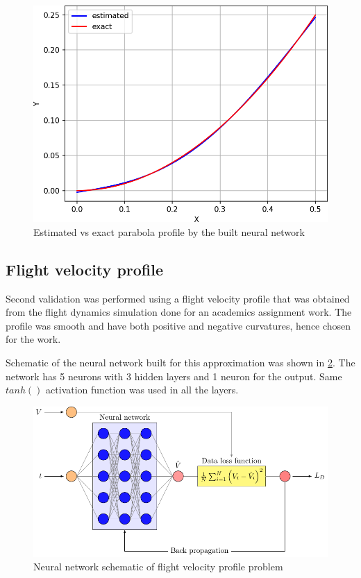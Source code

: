 \begin{figure}
   \center
    \includegraphics[scale=0.7]{supportingFiles/02_results/01_parabola_datadriven/estimation.png}
    \caption{Estimated vs exact parabola profile by the built neural network}
    \label{parabola_result}
\end{figure}


\subsection{Flight velocity profile}
\par{}
Second validation was performed using a flight velocity profile that was obtained
from the flight dynamics simulation done for an academics assignment work.
The profile was smooth and have both positive and negative curvatures, hence
chosen for the work. \\

\par{}
Schematic of the neural network built for this approximation was shown in
\cref{velocity_profile_network}. The network has 5 neurons with 3 hidden layers
and 1 neuron for the output. Same \(tanh()\) activation function was used
in all the layers. \\

\begin{figure}
   \center
    \includegraphics[scale=1]{supportingFiles/01_schematics/03_velocity_profile_network/velocity_profile.pdf}
    \caption{Neural network schematic of flight velocity profile problem}
    \label{velocity_profile_network}
\end{figure}

